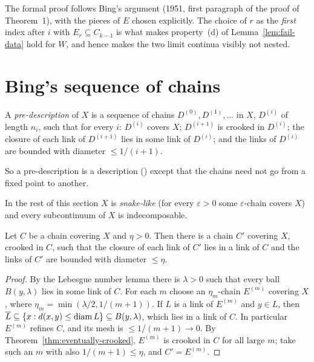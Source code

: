\begin{remark}
The formal proof follows Bing's argument (1951, first paragraph of the proof of Theorem~1), with the pieces of $E$ chosen explicitly. The
choice of $r$ as the \emph{first} index after $i$ with $E_r\subseteq C_{k-1}$ is what makes property~(d) of Lemma~\ref{lem:fail-data} hold
for $W$, and hence makes the two limit continua visibly not nested.
\end{remark}

\section{Bing's sequence of chains}\label{sec:predesc}

\begin{definition}\label{def:predesc}
A \emph{pre-description} of $X$ is a sequence of chains $D^{(0)},D^{(1)},\dots$ in $X$, $D^{(i)}$ of length $n_i$, such that for every $i$:
$D^{(i)}$ covers $X$; $D^{(i+1)}$ is crooked in $D^{(i)}$; the closure of each link of $D^{(i+1)}$ lies in some link of $D^{(i)}$; and
the links of $D^{(i)}$ are bounded with diameter $\le1/(i+1)$.
\end{definition}

So a pre-description is a description () except that the chains need not go from a fixed point to another.


In the rest of this section $X$ is \emph{snake-like} (for every $\varepsilon>0$ some $\varepsilon$-chain covers $X$) and every subcontinuum
of $X$ is indecomposable.

\begin{lemma}\label{lem:crooked-next}
Let $C$ be a chain covering $X$ and $\eta>0$. Then there is a chain $C'$ covering $X$, crooked in $C$, such that the closure of each link
of $C'$ lies in a link of $C$ and the links of $C'$ are bounded with diameter $\le\eta$.
\end{lemma}

\begin{proof}
By the Lebesgue number lemma there is $\lambda>0$ such that every ball $B(y,\lambda)$ lies in some link of $C$. For each $m$ choose an
$\eta_m$-chain $E^{(m)}$ covering $X$, where $\eta_m=\min(\lambda/2,1/(m+1))$. If $L$ is a link of $E^{(m)}$ and $y\in L$, then $\overline{L}\subseteq\left\{ x:d(x,y)\le\operatorname{diam} L \right\}\subseteq B(y,\lambda)$, which lies in a link of $C$. In particular $E^{(m)}$ refines $C$, and its mesh
is $\le1/(m+1)\to0$. By Theorem~\ref{thm:eventually-crooked}, $E^{(m)}$ is crooked in $C$ for all large $m$; take such an $m$ with also
$1/(m+1)\le\eta$, and $C'=E^{(m)}$.
\end{proof}

